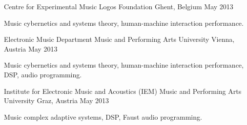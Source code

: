 \begin{cventries}
  \cventry
    {Centre for Experimental Music} %
    {Logos Foundation} %
    {Ghent, Belgium} %
    {May 2013} %
    {
      \begin{cvitems} %
        \item {Music cybernetics and systems theory, human-machine interaction performance.}
      \end{cvitems}
    }

  \cventry
    {Electronic Music Department} %
    {Music and Performing Arts University} %
    {Vienna, Austria} %
    {May 2013} %
    {
      \begin{cvitems} %
        \item {Music cybernetics and systems theory, human-machine interaction performance, DSP, audio programming.}
      \end{cvitems}
    }

  \cventry
    {Institute for Electronic Music and Acoustics (IEM)} %
    {Music and Performing Arts University} %
    {Graz, Austria} %
    {May 2013} %
    {
      \begin{cvitems} %
        \item {Music complex adaptive systems, DSP, Faust audio programming.}
      \end{cvitems}
    }

\end{cventries}
